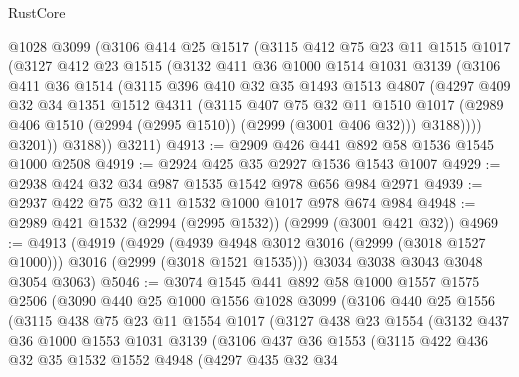 \begin{lexlean}{RustCore}
\begin{coremodule}
      @1028
      @3099
      (@3106
        @414
        @25
        @1517
        (@3115
          @412
          @75
          @23
          @11
          @1515
          @1017
          (@3127
            @412
            @23
            @1515
            (@3132
              @411
              @36
              @1000
              @1514
              @1031
              @3139
              (@3106
                @411
                @36
                @1514
                (@3115
                  @396
                  @410
                  @32
                  @35
                  @1493
                  @1513
                  @4807
                  (@4297
                    @409
                    @32
                    @34
                    @1351
                    @1512
                    @4311
                    (@3115
                      @407
                      @75
                      @32
                      @11
                      @1510
                      @1017
                      (@2989 @406 @1510 (@2994 (@2995 @1510)) (@2999 (@3001 @406 @32)))
                      @3188))))
              @3201))
          @3188))
      @3211)
@4913 := @2909 @426 @441 @892 @58 @1536 @1545 @1000 @2508
@4919 := @2924 @425 @35 @2927 @1536 @1543 @1007
@4929 := @2938 @424 @32 @34 @987 @1535 @1542 @978 @656 @984 @2971
@4939 := @2937 @422 @75 @32 @11 @1532 @1000 @1017 @978 @674 @984
@4948 := @2989 @421 @1532 (@2994 (@2995 @1532)) (@2999 (@3001 @421 @32))
@4969 := @4913
    (@4919
      (@4929
        (@4939 @4948 @3012 @3016 (@2999 (@3018 @1527 @1000)))
        @3016
        (@2999 (@3018 @1521 @1535)))
      @3034
      @3038
      @3043
      @3048
      @3054
      @3063)
@5046 := @3074
    @1545
    @441
    @892
    @58
    @1000
    @1557
    @1575
    @2506
    (@3090
      @440
      @25
      @1000
      @1556
      @1028
      @3099
      (@3106
        @440
        @25
        @1556
        (@3115
          @438
          @75
          @23
          @11
          @1554
          @1017
          (@3127
            @438
            @23
            @1554
            (@3132
              @437
              @36
              @1000
              @1553
              @1031
              @3139
              (@3106
                @437
                @36
                @1553
                (@3115
                  @422
                  @436
                  @32
                  @35
                  @1532
                  @1552
                  @4948
                  (@4297
                    @435
                    @32
                    @34

\end{coremodule}
\end{lexlean}
